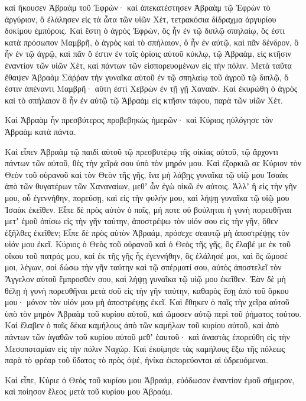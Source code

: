 {καὶ ἤκουσεν Ἁβραὰμ τοῦ Ἐφρών· καὶ ἀπεκατέστησεν Ἁβραὰμ τῷ Ἐφρὼν τὸ ἀργύριον, ὃ ἐλάλησεν εἰς τὰ ὦτα τῶν υἱῶν Χὲτ, τετρακόσια δίδραχμα ἀργυρίου δοκίμου ἐμπόροις.
Καὶ ἔστη ὁ ἀγρὸς Ἐφρών, ὃς ἦν ἐν τῷ διπλῷ σπηλαίῳ, ὅς ἐστι κατὰ πρόσωπον Μαμβρῆ, ὁ ἀγρὸς καὶ τὸ σπήλαιον, ὃ ἦν ἐν αὐτῷ, καὶ πᾶν δένδρον, ὃ ἦν ἐν τῷ ἀγρῷ, καὶ πᾶν ὅ ἐστιν ἐν τοῖς ὁρίοις αὐτοῦ κύκλῳ,
τῷ Ἁβραὰμ, εἰς κτῆσιν ἐναντίον τῶν υἱῶν Χὲτ, καὶ πάντων τῶν εἰσπορευομένων εἰς τὴν πόλιν.
Μετὰ ταῦτα ἔθαψεν Ἁβραὰμ Σάῤῥαν τὴν γυναῖκα αὐτοῦ ἐν τῷ σπηλαίῳ τοῦ ἀγροῦ τῷ διπλῷ, ὅ ἐστιν ἀπέναντι Μαμβρῆ· αὕτη ἐστὶ Χεβρὼν ἐν τῇ γῇ Χαναάν.
Καὶ ἐκυρώθη ὁ ἀγρὸς καὶ τὸ σπήλαιον ὃ ἦν ἐν αὐτῷ τῷ Ἁβραὰμ εἰς κτῆσιν τάφου, παρὰ τῶν υἱῶν Χέτ.

Καὶ Ἁβραὰμ ἦν πρεσβύτερος προβεβηκὼς ἡμερῶν· καὶ Κύριος ηὐλόγησε τὸν Ἁβραὰμ κατὰ πάντα.
\par }{\PP {}Καὶ εἶπεν Ἁβραὰμ τῷ παιδὶ αὐτοῦ τῷ πρεσβυτέρῳ τῆς οἰκίας αὐτοῦ, τῷ ἄρχοντι πάντων τῶν αὐτοῦ, θὲς τὴν χεῖρά σου ὑπὸ τὸν μηρόν μου.
Καὶ ἐξορκιῶ σε Κύριον τὸν Θεὸν τοῦ οὐρανοῦ καὶ τὸν Θεὸν τῆς γῆς, ἵνα μὴ λάβῃς γυναῖκα τῷ υἱῷ μου Ἰσαὰκ ἀπὸ τῶν θυγατέρων τῶν Χαναναίων, μεθʼ ὧν ἐγὼ οἰκῶ ἐν αὐτοις.
Ἀλλʼ ἢ εἰς τὴν γῆν μου, οὗ ἐγεννήθην, πορεύσῃ, καὶ εἰς τὴν φυλήν μου, καὶ λήψῃ γυναῖκα τῷ υἱῷ μου Ἰσαὰκ ἐκεῖθεν.
Εἶπε δὲ πρὸς αὐτὸν ὁ παῖς, μή ποτε οὐ βούληται ἡ γυνὴ πορευθῆναι μετʼ ἐμοῦ ὀπίσω εἰς τὴν γῆν ταύτην, ἀποστρέψω τὸν υἱόν σου εἰς τὴν γῆν, ὅθεν ἐξῆλθες ἐκεῖθεν;
Εἶπε δὲ πρὸς αὐτὸν Ἁβραάμ, πρόσεχε σεαυτῷ μὴ ἀποστρέψῃς τὸν υἱόν μου ἐκεῖ.
Κύριος ὁ Θεὸς τοῦ οὐρανοῦ καὶ ὁ Θεὸς τῆς γῆς, ὃς ἔλαβέ με ἐκ τοῦ οἴκου τοῦ πατρός μου, καἰ ἐκ τῆς γῆς ἧς ἐγεννήθην, ὃς ἐλάλησέ μοι, καὶ ὃς ὤμοσέ μοι, λέγων, σοὶ δώσω τὴν γῆν ταύτην καὶ τῷ σπέρματί σου, αὐτὸς ἀποστελεῖ τὸν Ἄγγελον αὐτοῦ ἔμπροσθέν σου, καὶ λήψῃ γυναῖκα τῷ υἱῷ μου ἐκεῖθεν.
Ἐὰν δὲ μὴ θέλῃ ἡ γυνὴ πορευθῆναι μετὰ σοῦ εἰς τὴν γῆν ταύτην, καθαρὸς ἔσῃ ἀπὸ τοῦ ὅρκου μου· μόνον τὸν υἱόν μου μὴ ἀποστρέψῃς ἐκεῖ.
Καὶ ἔθηκεν ὁ παῖς τὴν χεῖρα αὐτοῦ ὑπὸ τὸν μηρὸν Ἁβραὰμ τοῦ κυρίου αὐτοῦ, καὶ ὤμοσεν αὐτῷ περὶ τοῦ ῥήματος τούτου.
Καὶ ἔλαβεν ὁ παῖς δέκα καμήλους ἀπὸ τῶν καμήλων τοῦ κυρίου αὐτοῦ, καὶ ἀπὸ πάντων τῶν ἀγαθῶν τοῦ κυρίου αὐτοῦ μεθʼ ἑαυτοῦ· καὶ ἀναστὰς ἐπορεύθη εἰς τὴν Μεσοποταμίαν εἰς τὴν πόλιν Ναχώρ.
Καὶ ἐκοίμησε τὰς καμήλους ἔξω τῆς πόλεως παρὰ τὸ φρέαρ τοῦ ὕδατος τὸ πρὸς ὀψέ, ἡνίκα ἐκπορεύονται αἱ ὑδρευόμεναι.
\par }{\PP {}Καὶ εἶπε, Κύριε ὁ Θεὸς τοῦ κυρίου μου Ἁβραάμ, εὐόδωσον ἐναντίον ἐμοῦ σήμερον, καὶ ποίησον ἔλεος μετὰ τοῦ κυρίου μου Ἁβραάμ.
}
